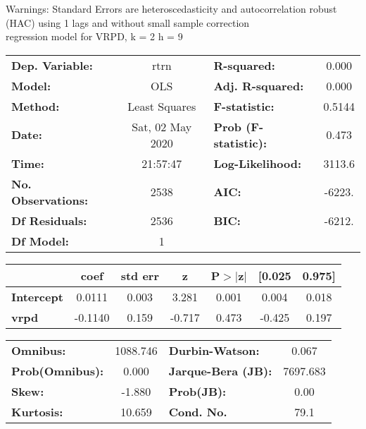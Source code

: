 Warnings: \newline
 [1] Standard Errors are heteroscedasticity and autocorrelation robust (HAC) using 1 lags and without small sample correction\\ 

regression model for VRPD, k = 2 h = 9\begin{center}
\begin{tabular}{lclc}
\toprule
\textbf{Dep. Variable:}    &       rtrn       & \textbf{  R-squared:         } &     0.000   \\
\textbf{Model:}            &       OLS        & \textbf{  Adj. R-squared:    } &     0.000   \\
\textbf{Method:}           &  Least Squares   & \textbf{  F-statistic:       } &    0.5144   \\
\textbf{Date:}             & Sat, 02 May 2020 & \textbf{  Prob (F-statistic):} &    0.473    \\
\textbf{Time:}             &     21:57:47     & \textbf{  Log-Likelihood:    } &    3113.6   \\
\textbf{No. Observations:} &        2538      & \textbf{  AIC:               } &    -6223.   \\
\textbf{Df Residuals:}     &        2536      & \textbf{  BIC:               } &    -6212.   \\
\textbf{Df Model:}         &           1      & \textbf{                     } &             \\
\bottomrule
\end{tabular}
\begin{tabular}{lcccccc}
                   & \textbf{coef} & \textbf{std err} & \textbf{z} & \textbf{P$> |$z$|$} & \textbf{[0.025} & \textbf{0.975]}  \\
\midrule
\textbf{Intercept} &       0.0111  &        0.003     &     3.281  &         0.001        &        0.004    &        0.018     \\
\textbf{vrpd}      &      -0.1140  &        0.159     &    -0.717  &         0.473        &       -0.425    &        0.197     \\
\bottomrule
\end{tabular}
\begin{tabular}{lclc}
\textbf{Omnibus:}       & 1088.746 & \textbf{  Durbin-Watson:     } &    0.067  \\
\textbf{Prob(Omnibus):} &   0.000  & \textbf{  Jarque-Bera (JB):  } & 7697.683  \\
\textbf{Skew:}          &  -1.880  & \textbf{  Prob(JB):          } &     0.00  \\
\textbf{Kurtosis:}      &  10.659  & \textbf{  Cond. No.          } &     79.1  \\
\bottomrule
\end{tabular}
\end{center}

